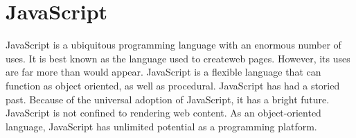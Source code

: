 \section{JavaScript}


JavaScript is a ubiquitous programming language with an
enormous number of uses. It is best known as the language
used to createweb pages\cite{hid-sp18-525-java}. However, its 
uses are far more than would appear. JavaScript is a flexible 
language that can function as object oriented, as well as 
procedural\cite{hid-sp18-525-java}. JavaScript has had a storied 
past\cite{hid-sp18-525-java}. Because of the universal adoption 
of JavaScript, it has a bright future. JavaScript is not 
confined to rendering web content. As an object-oriented 
language, JavaScript has unlimited potential as a 
programming platform\cite{hid-sp18-525-java}.
